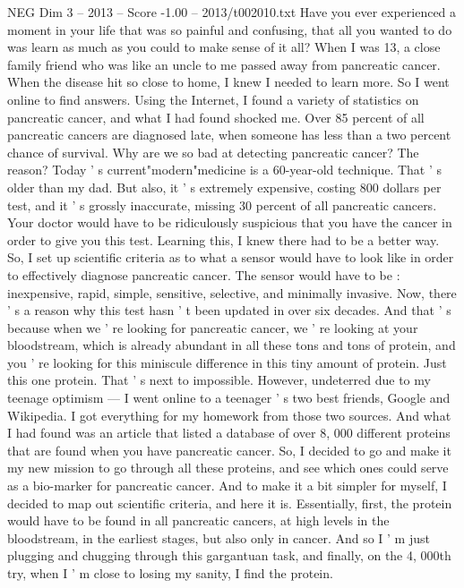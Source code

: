 \begin{textsample}{NEG Dim 3 – 2013 – Score -1.00 – 2013/t002010.txt}  \label{ex:f3_neg_032}
Have you ever experienced a moment in your life that was so painful and confusing, that all you wanted to do was learn as much as you could to make sense of it all?
When I was 13, a close family friend who was like an uncle to me passed away from pancreatic cancer.
When the disease hit so close to home, I knew I needed to learn more.
So I went online to find answers.
Using the Internet, I found a variety of statistics on pancreatic cancer, and what I had found shocked me.
Over 85 percent of all pancreatic cancers are diagnosed late, when someone has less than a two percent chance of survival.
Why are we so bad at detecting pancreatic cancer?
The reason?
Today ' s current"modern"medicine is a 60-year-old technique.
That ' s older than my dad.
But also, it ' s extremely expensive, costing 800 dollars per test, and it ' s grossly inaccurate, missing 30 percent of all pancreatic cancers.
Your doctor would have to be ridiculously suspicious that you have the cancer in order to give you this test.
Learning this, I knew there had to be a better way.
So, I set up scientific criteria as to what a sensor would have to look like in order to effectively diagnose pancreatic cancer.
The sensor would have to be : inexpensive, rapid, simple, sensitive, selective, and minimally invasive.
Now, there ' s a reason why this test hasn ' t been updated in over six decades.
And that ' s because when we ' re looking for pancreatic cancer, we ' re looking at your bloodstream, which is already abundant in all these tons and tons of protein, and you ' re looking for this miniscule difference in this tiny amount of protein.
Just this one protein.
That ' s next to impossible.
However, undeterred due to my teenage optimism — I went online to a teenager ' s two best friends, Google and Wikipedia.
I got everything for my homework from those two sources.
And what I had found was an article that listed a database of over 8, 000 different proteins that are found when you have pancreatic cancer.
So, I decided to go and make it my new mission to go through all these proteins, and see which ones could serve as a bio-marker for pancreatic cancer.
And to make it a bit simpler for myself, I decided to map out scientific criteria, and here it is.
Essentially, first, the protein would have to be found in all pancreatic cancers, at high levels in the bloodstream, in the earliest stages, but also only in cancer.
And so I ' m just plugging and chugging through this gargantuan task, and finally, on the 4, 000th try, when I ' m close to losing my sanity, I find the protein.

\end{textsample}
